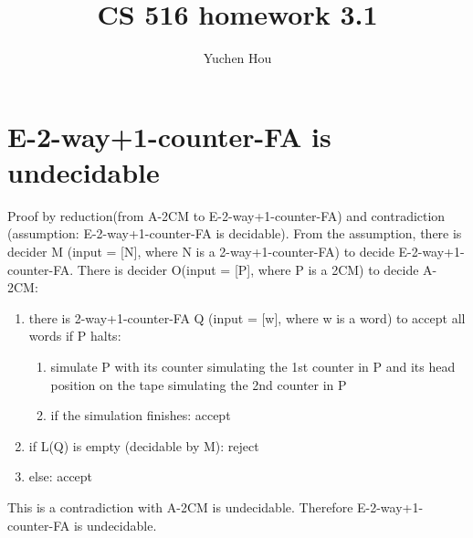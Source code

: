 \documentclass{article}
\begin{document}
\lstset{language=python, tabsize=4}
\title{CS 516 homework 3.1}
\author{Yuchen Hou}
\maketitle

\section{E-2-way+1-counter-FA is undecidable}
Proof by reduction(from A-2CM to E-2-way+1-counter-FA) and contradiction 
(assumption: E-2-way+1-counter-FA is decidable).
From the assumption, there is decider M (input = [N], where N is a 
2-way+1-counter-FA) to decide E-2-way+1-counter-FA.
There is decider O(input = [P], where P is a 2CM) to decide A-2CM:
\begin{enumerate}
	\item there is 2-way+1-counter-FA Q (input = [w], where w is a word) to 
	accept all words if P halts:
	\begin{enumerate}
		\item simulate P with its counter simulating the 1st counter in P and its head position on the tape simulating the 2nd counter in P
		\item if the simulation finishes: accept
	\end{enumerate}
	\item if L(Q) is empty (decidable by M): reject
	\item else: accept
\end{enumerate}
This is a contradiction with A-2CM is undecidable.
Therefore E-2-way+1-counter-FA is undecidable.
\end{document}
